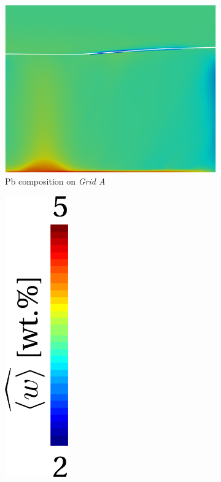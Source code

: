 \begin{figure}[htbp]
\centering
  \begin{subfigure}[t]{0.4\textwidth}
    \centering
  \includegraphics[width=\textwidth]{Chapter5/Graphics/2d/processed/1700s_compo.png}
  \caption{Pb composition on \emph{Grid A}}
    \label{fig:1700s_compo}
  \end{subfigure}
  \begin{subfigure}[t]{0.15\textwidth}
    \centering
  \includegraphics[width=0.3\textwidth]{Chapter5/Graphics/2d/colorbar_w.pdf}

\end{subfigure}
\end{figure}
